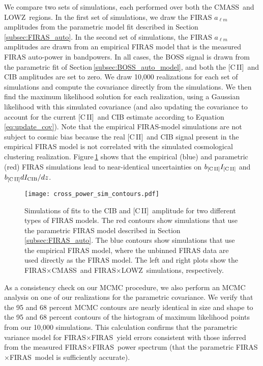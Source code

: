 \documentclass[fleqn,usenatbib]{mnras}
\newcommand{\lowz}{LOWZ}
\newcommand{\cmass}{CMASS}
\newcommand{\cii}{[C{\sc\,II}]}
\newcommand{\FF}{FIRAS${\times}$FIRAS}
\newcommand{\FLZ}{FIRAS${\times}$LOWZ}
\newcommand{\FC}{FIRAS${\times}$CMASS}
\begin{document}
We compare two sets of simulations, each performed over both the \cmass\, and \lowz\, regions. In the first set of simulations, we draw the FIRAS $a_{\ell m}$ amplitudes from the parametric model fit described in Section\,\ref{subsec:FIRAS_auto}. In the second set of simulations, the FIRAS $a_{\ell m}$ amplitudes are drawn from an empirical FIRAS model that is the measured FIRAS auto-power in bandpowers. In all cases, the BOSS signal is drawn from the parametric fit of Section\,\ref{subsec:BOSS_auto_model}, and both the \cii\ and CIB amplitudes are set to zero. We draw 10,000 realizations for each set of simulations and compute the covariance directly from the simulations. We then find the maximum likelihood solution for each realization, using a Gaussian likelihood with this simulated covariance (and also updating the covariance to account for the current \cii\ and CIB estimate according to Equation\,\ref{eq:update_cov}). Note that the empirical FIRAS-model simulations are not subject to cosmic bias because the real \cii\ and CIB signal present in the empirical FIRAS model is not correlated with the simulated cosmological clustering realization. Figure\,\ref{fig:cross_power_sims} shows that the empirical (blue) and parametric (red) FIRAS simulations lead to near-identical uncertainties on $b_{\rm \cii}I_{\rm \cii}$ and $b_{\rm \cii}dI_{\rm CIB}/dz$. 

\begin{figure}
  \texttt{[image: cross\_power\_sim\_contours.pdf]}
  \caption{Simulations of fits to the CIB and \cii\ amplitude for two different types of FIRAS models.  The red contours show simulations that use the parametric FIRAS model described in Section\,\ref{subsec:FIRAS_auto}. The blue contours show simulations that use the empirical FIRAS model, where the unbinned FIRAS data are used directly as the FIRAS model. The left and right plots show the  \FC\, and \FLZ\, simulations, respectively.}
  \label{fig:cross_power_sims}
\end{figure}

As a consistency check on our MCMC procedure, we also perform an MCMC analysis on one of our realizations for the parametric covariance. We verify that the 95 and 68 percent MCMC contours are nearly identical in size and shape to the 95 and 68 percent contours of the histogram of maximum likelihood points from our 10,000 simulations. This calculation confirms that the parametric variance model for \FF\ yield errors consistent with those inferred from the measured \FF\ power spectrum (that the parametric \FF\ model is sufficiently accurate).
\\

\twocolumn



\bsp	%
\label{lastpage}
\end{document}
